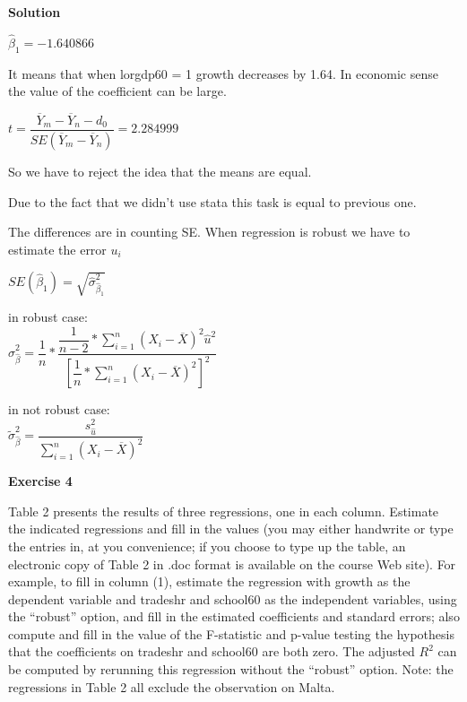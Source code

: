 \documentclass[12pt]{article}
\begin{document}
\textbf{Solution}
\medskip

\begin{list}{)~}{}
\item
$\hat{\beta}_1 = -1.640866$

It means that when lorgdp60 = 1 growth decreases by 1.64. In economic sense the value of the coefficient can be large.
\item
$t = \dfrac{\overline{Y}_m-\overline{Y}_n - d_0}{SE(\overline{Y}_m-\overline{Y}_n)}=2.284999$

So we have to reject the idea that the means are equal.
\item
Due to the fact that we didn't use stata this task is equal to previous one.
\item
The differences are in counting SE. When regression is robust we have to estimate the error $u_i$

$SE(\hat{\beta}_1) = \sqrt{\hat{\sigma}^2_{\hat{\beta}_1}}$

in robust case:\\
$\hat{\sigma}^2_{\hat{\beta}} = \dfrac{1}{n} * \dfrac{\dfrac{1}{n-2} * \sum^{n}_{i = 1}(X_i - \overline{X})^2\hat{u}^2}{\left[\dfrac{1}{n} * \sum^{n}_{i = 1}(X_i-\overline{X})^2\right]^2}$

in not robust case:\\
$\widetilde{\sigma}^2_{\hat{\beta}} = \dfrac{s^2_{\hat{u}}}{\sum^{n}_{i = 1}(X_i-\overline{X})^2}$
\end{list}

\textbf{Exercise 4}
\bigskip

Table 2 presents the results of three regressions, one in each column. Estimate the indicated regressions and fill in the values (you may either handwrite or type the entries in, at you convenience; if you choose to type up the table, an electronic copy of Table 2 in .doc format is available on the course Web site). For example, to fill in column (1), estimate the regression with growth as the dependent variable and tradeshr and school60 as the independent variables, using the “robust” option, and fill in the estimated coefficients and standard errors; also compute and fill in the value of the F-statistic and p-value testing the hypothesis that the coefficients on tradeshr and school60 are both zero. The adjusted $R^2$ can be computed by rerunning this regression without the “robust” option. Note: the regressions in Table 2 all exclude the observation on Malta.\\
\end{document}

